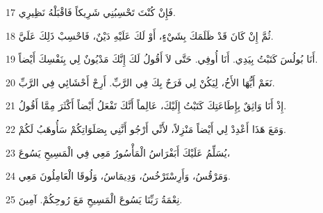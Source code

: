 \par 17 فَإِنْ كُنْتَ تَحْسِبُنِي شَرِيكاً فَاقْبَلْهُ نَظِيرِي.
\par 18 ثُمَّ إِنْ كَانَ قَدْ ظَلَمَكَ بِشَيْءٍ، أَوْ لَكَ عَلَيْهِ دَيْنٌ، فَاحْسِبْ ذَلِكَ عَلَيَّ.
\par 19 أَنَا بُولُسَ كَتَبْتُ بِيَدِي. أَنَا أُوفِي. حَتَّى لاَ أَقُولُ لَكَ إِنَّكَ مَدْيُونٌ لِي بِنَفْسِكَ أَيْضاً.
\par 20 نَعَمْ أَيُّهَا الأَخُ، لِيَكُنْ لِي فَرَحٌ بِكَ فِي الرَّبِّ. أَرِحْ أَحْشَائِي فِي الرَّبِّ.
\par 21 إِذْ أَنَا وَاثِقٌ بِإِطَاعَتِكَ كَتَبْتُ إِلَيْكَ، عَالِماً أَنَّكَ تَفْعَلُ أَيْضاً أَكْثَرَ مِمَّا أَقُولُ.
\par 22 وَمَعَ هَذَا أَعْدِدْ لِي أَيْضاً مَنْزِلاً، لأَنِّي أَرْجُو أَنَّنِي بِصَلَوَاتِكُمْ سَأُوهَبُ لَكُمْ.
\par 23 يُسَلِّمُ عَلَيْكَ أَبَفْرَاسُ الْمَأْسُورُ مَعِي فِي الْمَسِيحِ يَسُوعَ،
\par 24 وَمَرْقُسُ، وَأَرِسْتَرْخُسُ، وَدِيمَاسُ، وَلُوقَا الْعَامِلُونَ مَعِي.
\par 25 نِعْمَةُ رَبِّنَا يَسُوعَ الْمَسِيحِ مَعَ رُوحِكُمْ. آمِينَ.

